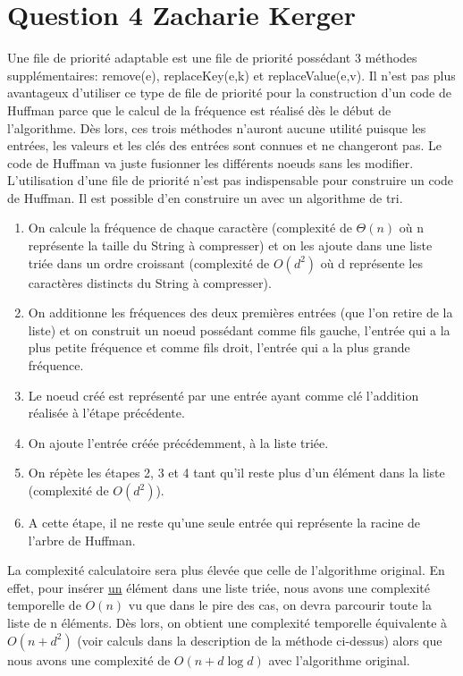 \documentclass[10pt,a4paper]{article}
\begin{document}
\section*{Question 4 Zacharie Kerger}
Une file de priorité adaptable est une file de priorité possédant 3 méthodes supplémentaires: remove(e), replaceKey(e,k) et replaceValue(e,v). Il n'est pas plus avantageux d'utiliser ce type de file de priorité pour la construction d'un code de Huffman parce que le calcul de la fréquence est réalisé dès le début de l'algorithme. Dès lors, ces trois méthodes n'auront aucune utilité puisque les entrées, les valeurs et les clés des entrées sont connues et ne changeront pas. Le code de Huffman va juste fusionner les différents noeuds sans les modifier.\\
L’utilisation d’une file de priorité n’est pas indispensable pour construire un code de Huffman. Il est possible d'en construire un avec un algorithme de tri.
\begin{enumerate}
\item On calcule la fréquence de chaque caractère (complexité de $\Theta(n)$ où n représente la taille du String à compresser) et on les ajoute dans une liste triée dans un ordre croissant (complexité de $O(d^{2})$ où d représente les caractères distincts du String à compresser).
\item On additionne les fréquences des deux premières entrées (que l'on retire de la liste) et on construit un noeud possédant comme fils gauche, l'entrée qui a la plus petite fréquence et comme fils droit, l'entrée qui a la plus grande fréquence.
\item Le noeud créé est représenté par une entrée ayant comme clé l'addition réalisée à l'étape précédente.
\item On ajoute l'entrée créée précédemment, à la liste triée.
\item On répète les étapes 2, 3 et 4 tant qu'il reste plus d'un élément dans la liste (complexité de $O(d^{2})$).
\item A cette étape, il ne reste qu'une seule entrée qui représente la racine de l'arbre de Huffman.
\end{enumerate}
La complexité calculatoire sera plus élevée que celle de l'algorithme original. En effet, pour insérer \underline{un} élément dans une liste triée, nous avons une complexité temporelle de $O(n)$ vu que dans le pire des cas, on devra parcourir toute la liste de n éléments. Dès lors, on obtient une complexité temporelle équivalente à $O(n + d^2)$ (voir calculs dans la description de la méthode ci-dessus) alors que nous avons une complexité de $O(n+d\log d)$ avec l'algorithme original.
\end{document}

